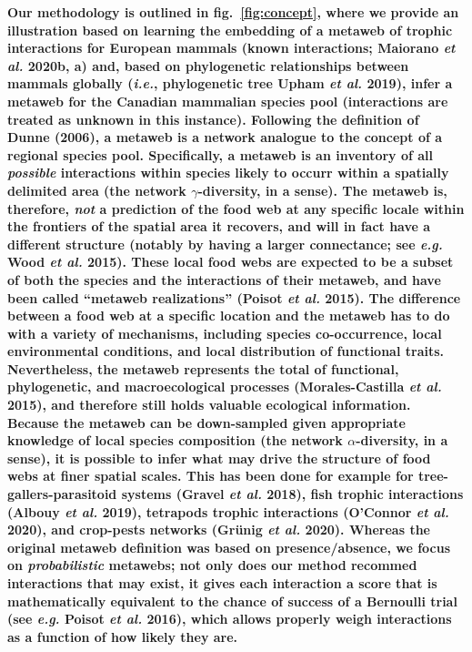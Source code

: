 \documentclass[11pt]{article}
\providecommand{\DIFaddtex}[1]{{\bf #1}} %
\providecommand{\DIFadd}[1]{\texorpdfstring{\DIFaddtex{#1}}{#1}} %
\begin{document}
\DIFadd{Our methodology is outlined in fig.~\ref{fig:concept}, where we provide
an illustration based on learning the embedding of a metaweb of trophic
interactions for European mammals (known interactions; Maiorano \emph{et
al.} 2020b, a) and, based on phylogenetic relationships between mammals
globally (\emph{i.e.}, phylogenetic tree Upham \emph{et al.} 2019),
infer a metaweb for the Canadian mammalian species pool (interactions
are treated as unknown in this instance). Following the definition of
Dunne (2006), a metaweb is a network analogue to the concept of a
regional species pool. Specifically, a metaweb is an inventory of all
\emph{possible} interactions within species likely to occurr within a
spatially delimited area (the network \(\gamma\)-diversity, in a sense).
The metaweb is, therefore, \emph{not} a prediction of the food web at
any specific locale within the frontiers of the spatial area it
recovers, and will in fact have a different structure (notably by having
a larger connectance; see \emph{e.g.} Wood \emph{et al.} 2015). These
local food webs are expected to be a subset of both the species and the
interactions of their metaweb, and have been called ``metaweb
realizations'' (Poisot \emph{et al.} 2015). The difference between a
food web at a specific location and the metaweb has to do with a variety
of mechanisms, including species co-occurrence, local environmental
conditions, and local distribution of functional traits. Nevertheless,
the metaweb represents the total of functional, phylogenetic, and
macroecological processes (Morales-Castilla \emph{et al.} 2015), and
therefore still holds valuable ecological information. Because the
metaweb can be down-sampled given appropriate knowledge of local species
composition (the network \(\alpha\)-diversity, in a sense), it is
possible to infer what may drive the structure of food webs at finer
spatial scales. This has been done for example for
tree-gallers-parasitoid systems (Gravel \emph{et al.} 2018), fish
trophic interactions (Albouy \emph{et al.} 2019), tetrapods trophic
interactions (O'Connor \emph{et al.} 2020), and crop-pests networks
(Grünig \emph{et al.} 2020). Whereas the original metaweb definition was
based on presence/absence, we focus on \emph{probabilistic} metawebs;
not only does our method recommed interactions that may exist, it gives
each interaction a score that is mathematically equivalent to the chance
of success of a Bernoulli trial (see \emph{e.g.} Poisot \emph{et al.}
2016), which allows properly weigh interactions as a function of how
likely they are.
}
\end{document}
